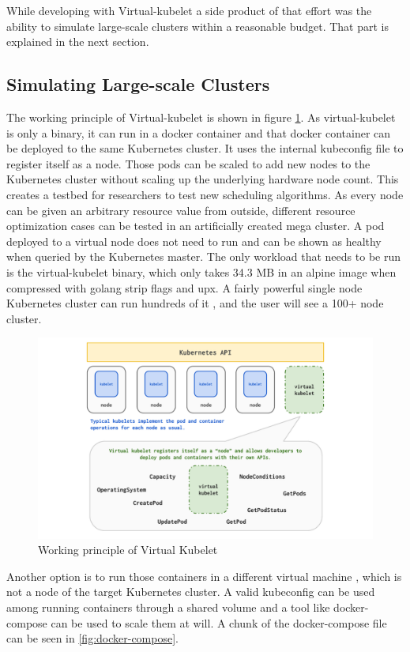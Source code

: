 While developing with Virtual-kubelet a side product of that effort was the ability to simulate large-scale clusters within a reasonable budget. That part is explained in the next section.
\subsection{Simulating Large-scale Clusters}
The working principle of Virtual-kubelet is shown in figure \ref{fig:vk}. As virtual-kubelet is only a binary, it can run in a docker container and that docker container can be deployed to the same Kubernetes cluster. It uses the internal kubeconfig file to register itself as a node. Those pods can be scaled to add new nodes to the Kubernetes cluster without scaling up the underlying hardware node count. This creates a testbed for researchers to test new scheduling algorithms. As every node can be given an arbitrary resource value from outside, different resource optimization cases can be tested in an artificially created mega cluster. A pod deployed to a virtual node does not need to run and can be shown as healthy when queried by the Kubernetes master. The only workload that needs to be run is the virtual-kubelet binary, which only takes 34.3 MB in an alpine image when compressed with golang strip flags and upx. A fairly powerful single node Kubernetes cluster can run hundreds of it , and the user will see a 100+ node cluster.

\begin{figure}[htpb]
  \centering
  \includegraphics[width=1\textwidth]{figures/diagram.pdf}
  \caption{Working principle of Virtual Kubelet \cite{virtual}} \label{fig:vk}
\end{figure}

Another option is to run those containers in a different virtual machine , which is not a node of the target Kubernetes cluster. A valid kubeconfig can be used among running containers through a shared volume and a tool like docker-compose can be used to scale them at will. A chunk of the docker-compose file can be seen in \ref{fig:docker-compose}.

